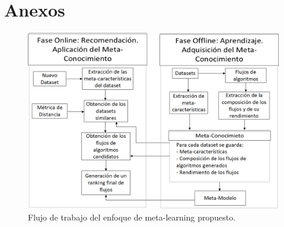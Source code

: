 \documentclass[a4paper,12pt]{article}
\begin{document}



\newpage



\newpage
\appendix
\section{Anexos}

\begin{figure}[htb]
	\centering
	\includegraphics[scale=.5]{Figures/system.png}
	\caption{Flujo de trabajo del enfoque de meta-learning propuesto.}
	\label{fig:system}
\end{figure}

\end{document}
